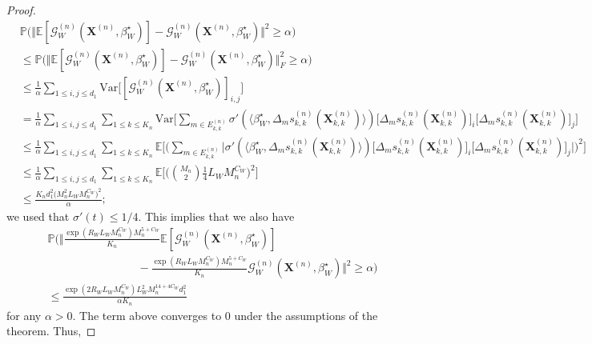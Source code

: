 \documentclass{article}
\begin{document}
\begin{proof}
{\allowdisplaybreaks
\begin{align*}
    &\mathbb{P}\big( \Vert  \mathbb{E}[\mathcal{G}_W^{(n)}(\mathbf{X}^{(n)},\beta_W^{\star})] - \mathcal{G}_W^{(n)}(\mathbf{X}^{(n)},\beta_W^{\star}) \Vert^2  \geq \alpha \big) \\
    & \leq \mathbb{P}\big( \Vert \mathbb{E}[\mathcal{G}_W^{(n)}(\mathbf{X}^{(n)},\beta_W^{\star})] - \mathcal{G}_W^{(n)}(\mathbf{X}^{(n)},\beta_W^{\star}) \Vert_F^2 \geq \alpha \big) \\
    & \leq \frac{1}{\alpha} \sum_{1 \leq i,j \leq d_1} \mathrm{Var}\big[ [\mathcal{G}_W^{(n)}(\mathbf{X}^{(n)},\beta_W^{\star})]_{i,j} \big] \\
    &= \frac{1}{\alpha } \sum_{1 \leq i,j \leq d_1} \sum_{1 \leq k \leq K_n} \mathrm{Var}\bigg[ \sum_{m \in E_{k,k}^{(n)}} \sigma'(\langle \beta_W^{\star},  \Delta_m s_{k,k}^{(n)}(\mathbf{X}_{k,k}^{(n)}) \rangle)  \big[\Delta_m s_{k,k}^{(n)}(\mathbf{X}_{k,k}^{(n)}) \big]_i \big[\Delta_m s_{k,k}^{(n)}(\mathbf{X}_{k,k}^{(n)})\big]_j  \bigg] \\
    &\leq \frac{1}{\alpha } \sum_{1 \leq i,j \leq d_1} \sum_{1 \leq k \leq K_n} \mathbb{E}\bigg[ \bigg(\sum_{m \in E_{k,k}^{(n)}} \big\vert \sigma'(\langle \beta_W^{\star},  \Delta_m s_{k,k}^{(n)}(\mathbf{X}_{k,k}^{(n)}) \rangle)  \big[\Delta_m s_{k,k}^{(n)}(\mathbf{X}_{k,k}^{(n)}) \big]_i \big[\Delta_m s_{k,k}^{(n)}(\mathbf{X}_{k,k}^{(n)})\big]_j \big\vert \bigg)^2 \bigg] \\
    & \leq \frac{1}{\alpha } \sum_{1 \leq i,j \leq d_1} \sum_{1 \leq k \leq K_n} \mathbb{E}\bigg[ \bigg( \binom{M_n}{2} \frac{1}{4} L_WM_n^{C_W} \bigg)^2 \bigg] \\
    & \leq \frac{K_n d_1^2  \big( M_n^2  L_W M_n^{C_W} \big)^2 }{\alpha };
\end{align*}}
 we used that $\sigma'(t) \leq 1/4$. 
This implies that we also have
\begin{align*}
     &\mathbb{P}\bigg( \bigg\Vert  \frac{\exp(R_WL_WM_n^{C_W}) M_n^{5+C_W}}{K_n}\mathbb{E}[\mathcal{G}_W^{(n)}(\mathbf{X}^{(n)},\beta_W^{\star})] \\
     & \qquad \qquad \qquad \qquad - \frac{\exp(R_WL_WM_n^{C_W}) M_n^{5+C_W}}{K_n}\mathcal{G}_W^{(n)}(\mathbf{X}^{(n)},\beta_W^{\star}) \bigg\Vert^2  \geq \alpha \bigg) \\
     & \leq  \frac{ \exp(2R_WL_WM_n^{C_W}) L_W^2 M_n^{14+4C_W} d_1^2  }{\alpha K_n }
\end{align*}
for any $\alpha>0$. The term above converges to $0$ under the assumptions  of the theorem. Thus, 

\end{proof}
\end{document}
